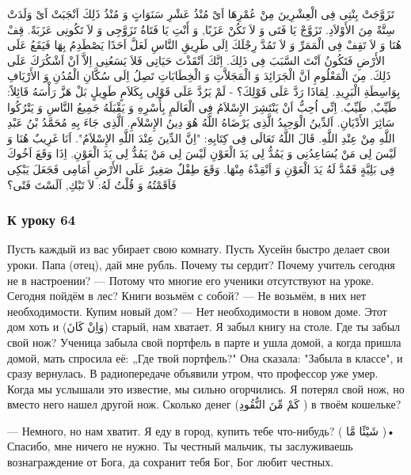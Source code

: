 \documentclass[a5paper]{article}
\begin{document}
تَزَوَّجَتْ بِنْتِى فِى الْعِشْرِينَ مِنْ عُمْرِهَا اَىْ مُنْذُ عَشْرِ سَنَوَاتٍ وَ مُنْذُ ذَلِكَ اَنْجَبَتْ اَىْ وَلَدَتْ سِتَّةً مِنَ الأَوْلاَدِ. تَزَوَّجْ يَا فَتَى وَ لاَ تَكُنْ عَزَبًا, وَ أَنْتِ يَا فَتَاةُ تَزَوَّجِى وَ لاَ تَكُونِى عَزَبَةً. قِفْ هُنَا وَ لاَ تَقِفْ فِى الْمَمَرِّ وَ لاَ تَمُدَّ رِجْلَكَ اِلَى طَرِيقِ النَّاسِ لَعَلَّ اَحَدًا يَصْطَدِمُ بِهَا فَيَقَعُ عَلَى الأَرْضِ فَتَكُونُ اَنْتَ السَّبَبَ فِى ذَلِكَ. اِنَّكَ اَنْقَذْتَ حَيَاتِى فَلاَ يَسَعُنِى اِلاَّ اَنْ اَشْكُرَكَ عَلَى ذَلِكَ. مِنَ الْمَعْلُومِ اَنَّ الْجَرَائِدَ وَ الْمَجَلاَّتِ وَ الْخِطَابَاتِ تَصِلُ اِلَى سُكَّانِ الْمُدُنِ وَ الأَرْيَافِ بِوَاسِطَةِ الْبَرِيدِ. لِمَاذَا رَدَّ عَلَى قَوْلِكَ؟ - لَمْ يَرُدَّ عَلَى قَوْلِى بِكَلاَمٍ طَوِيلٍ بَلْ هَزَّ رَأْسَهُ قَائِلاً: طَيِّبٌ, طَيِّبٌ. اِنِّى اُحِبُّ اَنْ يَنْتَشِرَ الإِسْلاَمُ فِى الْعَالَمِ بِأَسْرِهِ وَ يَقْبَلَهُ جَمِيعُ النَّاسِ وَ يَتْرُكُوا سَائِرَ الأَدْيَانِ. اَلدِّينُ الْوَحِيدُ الَّذِى يَرْضَاهُ اللَّهُ هُوَ دِينُ الإِسْلاَمِ. اَلَّذِى جَاءَ بِهِ مُحَمَّدُ بْنُ عَبْدِ اللَّهِ مِنْ عِنْدِ اللَّهِ. قَالَ اللَّهُ تَعَالَى فِى كِتَابِهِ: "اِنَّ الدِّينَ عِنْدَ اللَّهِ الإِسْلاَمُ". اَنَا غَرِيبٌ هُنَا وَ لَيْسَ لِى مَنْ يُسَاعِدُنِى وَ يَمُدُّ لِى يَدَ الْعَوْنِ لَيْسَ لِى مَنْ يَمُدُّ لِى يَدَ الْعَوْنِ. اِذَا وَقَعَ اَخُوكَ فِى بَلِيَّةٍ فَمُدَّ لَهُ يَدَ الْعَوْنِ وَ اَنْقِذْهُ مِنْهَا. وَقَعَ طِفْلٌ صَغِيرٌ عَلَى الأَرْضِ أَمَامِى فَجَعَلَ يَبْكِى فَاَقَمْتُهُ وَ قُلْتُ لَهُ: لاَ تَبْكِ, اَلَسْتَ فَتًى؟ \ \ \ \ 

\subsubsection{К уроку 64}
Пусть каждый из вас убирает свою комнату. Пусть Хусейн быстро делает свои уроки. Папа (отец), дай мне рубль. Почему ты сердит? Почему учитель сегодня не в настроении? — Потому что многие его ученики отсутствуют на уроке. Сегодня пойдём в лес? Книги возьмём с собой? — Не возьмём, в них нет необходимости. Купим новый дом? — Нет необходимости в новом доме. Этот дом хоть и (وَاِنْ كَانَ) старый, нам хватает. Я забыл книгу на столе. Где ты забыл свой нож? Ученица забыла свой портфель в парте и ушла домой, а когда пришла домой, мать спросила её: „Где твой портфель?" Она сказала: "Забыла в классе", и сразу вернулась. В радиопередаче объявили утром, что профессор уже умер. Когда мы услышали это известие, мы сильно огорчились. Я потерял свой нож, но вместо него нашел другой нож. Сколько денег (كَمْ مِّنَ النُّقُودِ ) в твоём кошельке?

— Немного, но нам хватит. Я еду в город, купить тебе что-нибудь? ( شَيْئًا مَّا )• Спасибо, мне ничего не нужно. Ты честный мальчик, ты заслуживаешь вознаграждение от Бога, да сохранит тебя Бог, Бог любит честных.
\end{document}
